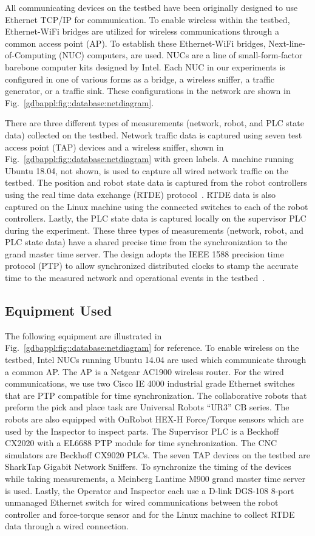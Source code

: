 All communicating devices on the testbed have been originally designed to use Ethernet TCP/IP for communication. To enable wireless within the testbed, Ethernet-WiFi bridges are utilized for wireless communications through a common access point (AP). To establish these Ethernet-WiFi bridges, Next-line-of-Computing (NUC) computers, are used.  NUCs are a line of small-form-factor barebone computer kits designed by Intel.   Each NUC in our experiments is configured in one of various forms as a bridge, a wireless sniffer, a traffic generator, or a traffic sink. These configurations in the network are shown in Fig.~\ref{gdbappl:fig::database:netdiagram}.

There are three different types of measurements (network, robot, and PLC state data) collected on the testbed. Network traffic data is captured using seven test access point (TAP) devices and a wireless sniffer, shown in Fig.~\ref{gdbappl:fig::database:netdiagram} with green labels. A machine running Ubuntu 18.04, not shown, is used to capture all wired network traffic on the testbed. The position and robot state data is captured from the robot controllers using the real time data exchange (RTDE) protocol~\cite{RTDE}. RTDE data is also captured on the Linux machine using the connected switches to each of the robot controllers. Lastly, the PLC state data is captured locally on the supervisor PLC during the experiment. These three types of measurements (network, robot, and PLC state data) have a shared precise time from the synchronization to the grand master time server. The design adopts the IEEE 1588 precision time protocol (PTP) to allow synchronized distributed clocks to stamp the accurate time to the measured network and operational events in the testbed~\cite{IEEE-Std-1588-2008-redline}.

\subsection{Equipment Used}

The following equipment are illustrated in Fig.~\ref{gdbappl:fig::database:netdiagram} for reference.
To enable wireless on the testbed, Intel NUCs running Ubuntu 14.04 are used which communicate through a common AP. The AP is a Netgear AC1900 wireless router. For the wired communications, we use two Cisco IE 4000 industrial grade Ethernet switches that are PTP compatible for time synchronization. The collaborative robots that preform the pick and place task are Universal Robots “UR3” CB series. The robots are also equipped with OnRobot HEX-H Force/Torque sensors which are used by the Inspector to inspect parts. The Supervisor PLC is a Beckhoff CX2020 with a EL6688 PTP module for time synchronization. The CNC simulators are Beckhoff CX9020 PLCs. The seven TAP devices on the testbed are SharkTap Gigabit Network Sniffers. To synchronize the timing of the devices while taking measurements, a Meinberg Lantime M900 grand master time server is used. Lastly, the Operator and Inspector each use a D-link DGS-108 8-port unmanaged Ethernet switch for wired communications between the robot controller and force-torque sensor and for the Linux machine to collect RTDE data through a wired connection.

